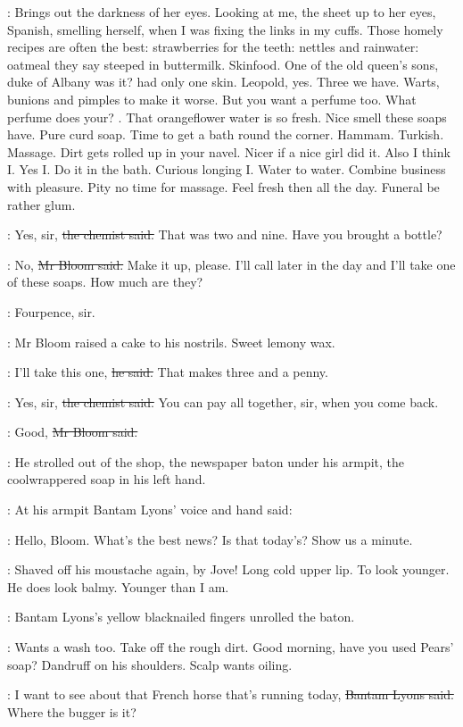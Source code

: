 \BloomInt:
Brings out the darkness of her eyes.
Looking at me,
the sheet up to her eyes,
Spanish,
smelling herself,
when I was fixing the links in my cuffs.
Those homely recipes are often the best:
strawberries for the teeth:
nettles and rainwater:
oatmeal they say steeped in buttermilk.
Skinfood.
One of the old queen's sons,
duke of Albany was it?
had only one skin.
Leopold, yes.
Three we have.
Warts, bunions and pimples to make it worse.
But you want a perfume too.
What perfume does your?
.
That orangeflower water is so fresh.
Nice smell these soaps have.
Pure curd soap.
Time to get a bath round the corner.
Hammam.
Turkish.
Massage.
Dirt gets rolled up in your navel.
Nicer if a nice girl did it.
Also I think I.
Yes I.
Do it in the bath.
Curious longing I.
Water to water.
Combine business with pleasure.
Pity no time for massage.
Feel fresh then all the day.
Funeral be rather glum.

\sweny:
Yes, sir,
\sout{the chemist said.}
That was two and nine.
Have you brought a bottle?

\Bloom:
No,
\sout{Mr Bloom said.}
Make it up, please.
I'll call later in the day
and I'll take one of these soaps.
How much are they?

\sweny:
Fourpence, sir.

:
Mr Bloom raised a cake to his nostrils.
Sweet lemony wax.

\Bloom:
I'll take this one,
\sout{he said.}
That makes three and a penny.

\sweny:
Yes, sir,
\sout{the chemist said.}
You can pay all together, sir, when you come back.

\Bloom:
Good,
\sout{Mr Bloom said.}

:
He strolled out of the shop,
the newspaper baton under his armpit,
the coolwrappered soap in his left hand.

:
At his armpit
Bantam Lyons' voice and hand said:

\lyons:
Hello, Bloom.
What's the best news?
Is that today's?
Show us a minute.

\BloomInt:
Shaved off his moustache again, by Jove!
Long cold upper lip.
To look younger.
He does look balmy.
Younger than I am.

:
Bantam Lyons's yellow blacknailed fingers unrolled the baton.

\BloomInt:
Wants a wash too.
Take off the rough dirt.
Good morning, have you used Pears' soap?
Dandruff on his shoulders.
Scalp wants oiling.

\lyons:
I want to see about that French horse that's running today,
\sout{Bantam Lyons said.}
Where the bugger is it?

